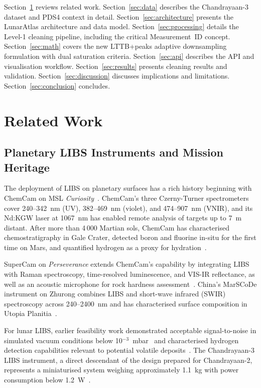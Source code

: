 \documentclass[a4paper,twocolumn,10pt]{article}
\begin{document}
Section~\ref{sec:related} reviews related work.
Section~\ref{sec:data} describes the Chandrayaan-3 dataset and PDS4
context in detail.  Section~\ref{sec:architecture} presents the
LunarAtlas architecture and data model.
Section~\ref{sec:processing} details the Level-1 cleaning pipeline,
including the critical Measurement~ID concept.
Section~\ref{sec:math} covers the new LTTB+peaks adaptive downsampling
formulation with dual saturation criteria.
Section~\ref{sec:api} describes the API and visualisation workflow.
Section~\ref{sec:results} presents cleaning results and validation.
Section~\ref{sec:discussion} discusses implications and limitations.
Section~\ref{sec:conclusion} concludes.


\section{Related Work}
\label{sec:related}

\subsection{Planetary LIBS Instruments and Mission Heritage}

The deployment of LIBS on planetary surfaces has a rich history
beginning with ChemCam on MSL \emph{Curiosity}~\cite{Wiens2012,
Maurice2012}.  ChemCam's three Czerny-Turner spectrometers cover
240--342~nm (UV), 382--469~nm (violet), and 474--907~nm (VNIR), and
its Nd:KGW laser at 1067~nm has enabled remote analysis of targets up
to 7~m distant.  After more than 4\,000 Martian sols, ChemCam has
characterised chemostratigraphy in Gale Crater, detected boron and
fluorine in-situ for the first time on Mars, and quantified hydrogen as
a proxy for hydration~\cite{Gasda2017,Schroder2015}.

SuperCam on \emph{Perseverance} extends ChemCam's capability by
integrating LIBS with Raman spectroscopy, time-resolved luminescence,
and VIS-IR reflectance, as well as an acoustic microphone for rock
hardness assessment~\cite{Wiens2020,Maurice2022}.  China's MarSCoDe
instrument on Zhurong combines LIBS and short-wave infrared (SWIR)
spectroscopy across 240--2400~nm and has characterised surface
composition in Utopia Planitia~\cite{Xu2021,Zhao2023}.

For lunar LIBS, earlier feasibility work demonstrated acceptable
signal-to-noise in simulated vacuum conditions below
10$^{-3}$~mbar~\cite{Knight2000,Lasue2012} and characterised
hydrogen detection capabilities relevant to potential volatile
deposits~\cite{Yumoto2023}.  The Chandrayaan-3 LIBS instrument, a
direct descendant of the design prepared for Chandrayaan-2, represents
a miniaturised system weighing approximately 1.1~kg with power
consumption below 1.2~W~\cite{Laxmiprasad2020}.
\end{document}
